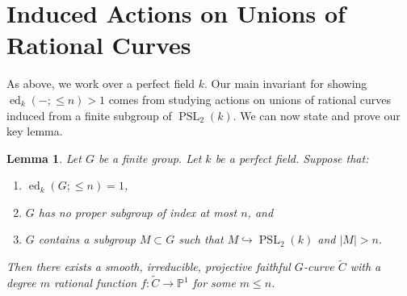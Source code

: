 \documentclass[11pt]{amsart}
\newtheorem{lemma}[theorem]{Lemma}
\theoremstyle{definition}
\numberwithin{equation}{section}
\newcommand{\into}{\hookrightarrow}
\newcommand{\Pb}{\mathbb{P}}
\DeclareMathOperator{\PSL}{PSL}
\newcommand{\tC}{\widetilde{C}}
\DeclareMathOperator{\ed}{ed}
\begin{document}
\section{Induced Actions on Unions of Rational Curves}
As above, we work over a perfect field $k$. Our main invariant for showing $\ed_k(-;\le n)>1$ comes from studying actions on unions of rational curves induced from a finite subgroup of $\PSL_2(k)$. We can now state and prove our key lemma.
\begin{lemma}\label{l:irred}
	Let $G$ be a finite group. Let $k$ be a perfect field. Suppose that:
    \begin{enumerate}
        \item $\ed_k(G;\le n)=1$,
        \item $G$ has no proper subgroup of index at most $n$, and
        \item $G$ contains a subgroup $M\subset G$ such that $M\into \PSL_2(k)$ and $|M|>n$.
    \end{enumerate}
    Then there exists a smooth, irreducible, projective faithful $G$-curve $\tilde{C}$ with a degree $m$ rational function $f\colon\tC\to\Pb^1$ for some $m\le n$.  
\end{lemma}
\end{document}
